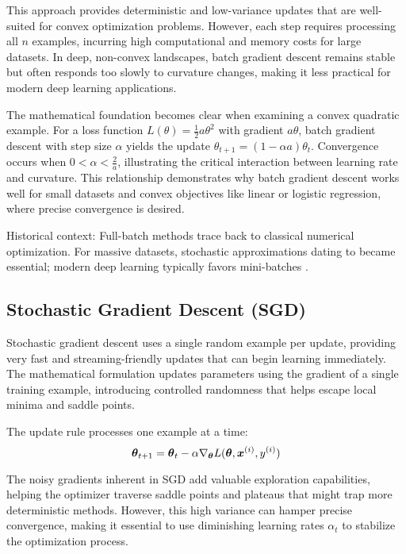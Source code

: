 This approach provides deterministic and low-variance updates that are well-suited for convex optimization problems. However, each step requires processing all \(n\) examples, incurring high computational and memory costs for large datasets. In deep, non-convex landscapes, batch gradient descent remains stable but often responds too slowly to curvature changes, making it less practical for modern deep learning applications.

The mathematical foundation becomes clear when examining a convex quadratic example. For a loss function \(L(\theta)=\tfrac{1}{2}a\theta^2\) with gradient \(a\theta\), batch gradient descent with step size \(\alpha\) yields the update \(\theta_{t+1}=(1-\alpha a)\theta_t\). Convergence occurs when \(0<\alpha<\tfrac{2}{a}\), illustrating the critical interaction between learning rate and curvature. This relationship demonstrates why batch gradient descent works well for small datasets and convex objectives like linear or logistic regression, where precise convergence is desired.

Historical context: Full-batch methods trace back to classical numerical optimization. For massive datasets, stochastic approximations dating to \cite{RobbinsMonro1951} became essential; modern deep learning typically favors mini-batches \cite{GoodfellowEtAl2016,WebOptimizationDLBook,D2LChapterOptimization}.

\subsection{Stochastic Gradient Descent (SGD)}

Stochastic gradient descent uses a single random example per update, providing very fast and streaming-friendly updates that can begin learning immediately. The mathematical formulation updates parameters using the gradient of a single training example, introducing controlled randomness that helps escape local minima and saddle points.

The update rule processes one example at a time:
\begin{equation}
\boldsymbol{\theta}_{t+1} = \boldsymbol{\theta}_t - \alpha \nabla_{\boldsymbol{\theta}} L(\boldsymbol{\theta}, \boldsymbol{x}^{(i)}, y^{(i)})
\end{equation}

The noisy gradients inherent in SGD add valuable exploration capabilities, helping the optimizer traverse saddle points and plateaus that might trap more deterministic methods. However, this high variance can hamper precise convergence, making it essential to use diminishing learning rates \(\alpha_t\) to stabilize the optimization process.

